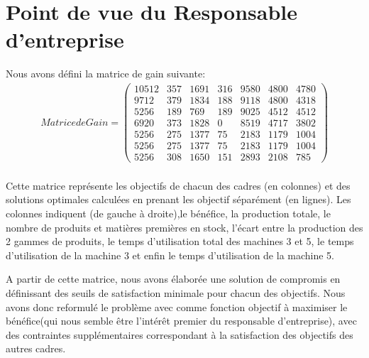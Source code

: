 \documentclass[12pt]{article}
\begin{document}
\section{Point de vue du Responsable d'entreprise}
Nous avons défini la matrice de gain suivante:
\begin{align*}
Matrice de Gain =
 \begin{pmatrix}
    10512    &357   &1691    &316   &9580   &4800   &4780\\
    9712     &379   &1834    &188   &9118   &4800   &4318\\
    5256    &189    &769    &189     &9025   &4512   &4512\\
    6920    &373   &1828    &0       &8519    &4717   &3802\\
    5256    &275   &1377    &75     &2183    &1179   &1004\\
    5256    &275   &1377   &75     &2183    &1179   &1004\\
    5256    &308   &1650    &151   &2893    &2108    &785
 \end{pmatrix}
\end{align*}\\

Cette matrice représente les objectifs de chacun des cadres (en colonnes) et des solutions optimales calculées en prenant les objectif séparément (en lignes). Les colonnes indiquent (de gauche à droite),le bénéfice, la production totale, le nombre de produits et matières premières en stock, l'écart entre la production des 2 gammes de produits, le temps d'utilisation total des machines 3 et 5, le temps d'utilisation de la machine 3 et enfin le temps d'utilisation de la machine 5.

A partir de cette matrice, nous avons élaborée une solution de compromis en définissant des seuils de satisfaction minimale pour chacun des objectifs. Nous avons donc reformulé le problème avec comme fonction objectif à maximiser le bénéfice(qui nous semble être l'intérêt premier du responsable d'entreprise), avec des contraintes supplémentaires correspondant à la satisfaction des objectifs des autres cadres. 
\end{document}
